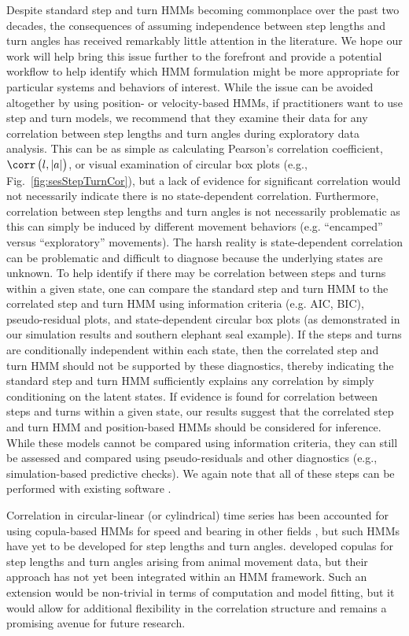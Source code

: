\documentclass[12pt]{article}\usepackage[]{graphicx}\usepackage[]{xcolor}
\begin{document}
Despite standard step and turn HMMs becoming commonplace over the past two decades, the consequences of assuming independence between step lengths and turn angles has received remarkably little attention in the literature. We hope our work will help bring this issue further to the forefront and provide a potential workflow to help identify which HMM formulation might be more appropriate for particular systems and behaviors of interest. While the issue can be avoided altogether by using position- or velocity-based HMMs, if practitioners want to use step and turn models, we recommend that they examine their data for any correlation between step lengths and turn angles during exploratory data analysis. This can be as simple as calculating Pearson's correlation coefficient, $\corr \left(l,\left|a \right| \right)$, or visual examination of circular box plots (e.g., Fig.\ \ref{fig:sesStepTurnCor}), but a lack of evidence for significant correlation would not necessarily indicate there is no state-dependent correlation. Furthermore, correlation between step lengths and turn angles is not necessarily problematic as this can simply be induced by different movement behaviors (e.g. ``encamped'' versus ``exploratory'' movements). The harsh reality is state-dependent correlation can be problematic and difficult to diagnose because the underlying states are unknown. To help identify if there may be correlation between steps and turns within a given state, one can compare the standard step and turn HMM to the correlated step and turn HMM using information criteria (e.g. AIC, BIC), pseudo-residual plots, and state-dependent circular box plots (as demonstrated in our simulation results and southern elephant seal example). If the steps and turns are conditionally independent within each state, then the correlated step and turn HMM should not be supported by these diagnostics, thereby indicating the standard step and turn HMM sufficiently explains any correlation by simply conditioning on the latent states. If evidence is found for correlation between steps and turns within a given state, our results suggest that the correlated step and turn HMM and position-based HMMs should be considered for inference. While these models cannot be compared using information criteria, they can still be assessed and compared using pseudo-residuals and other diagnostics (e.g., simulation-based predictive checks). We again note that all of these steps can be performed with existing software \citep[e.g.,][]{McClintockMichelot2018}. 

Correlation in circular-linear (or cylindrical) time series has been accounted for using copula-based HMMs for speed and bearing in other fields \citep[e.g.,][]{lagona2019copula}, but such HMMs have yet to be developed for step lengths and turn angles. \cite{hodel2022circular} developed copulas for step lengths and turn angles arising from animal movement data, but their approach has not yet been integrated within an HMM framework. Such an extension would be non-trivial in terms of computation and model fitting, but it would allow for additional flexibility in the correlation structure and remains a promising avenue for future research.
\end{document}

